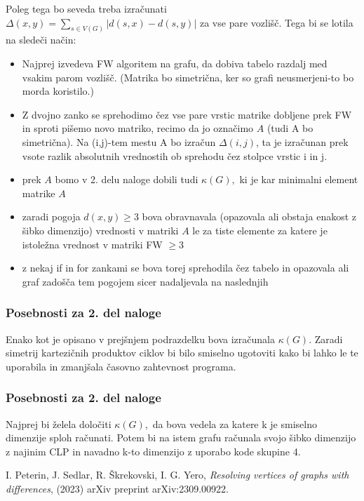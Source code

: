\documentclass[a4paper,12pt]{article}
\begin{document}
Poleg tega bo seveda treba izračunati $\Delta(x,y) = \sum_{s \in V(G) } |d(s,x) - d(s,y)|$ za vse pare vozlišč. Tega bi se lotila na sledeči način:
\begin{itemize}
    \item Najprej izvedeva FW algoritem na grafu, da dobiva tabelo razdalj med vsakim parom vozlišč. (Matrika bo simetrična, ker so grafi neusmerjeni-to bo morda koristilo.)
    \item Z dvojno zanko se sprehodimo čez vse pare vrstic matrike dobljene prek FW in sproti pišemo novo matriko, recimo da jo označimo $A$ (tudi A bo simetrična). Na (i,j)-tem mestu A bo izračun $\Delta(i,j)$, ta je izračunan prek vsote razlik absolutnih vrednostih ob sprehodu čez stolpce vrstic i in j.
    \item prek $A$ bomo v 2. delu naloge dobili tudi $\kappa(G),$ ki je kar minimalni element matrike $A$
    \item zaradi pogoja $d(x,y) \geq 3$ bova obravnavala (opazovala ali obstaja enakost z šibko dimenzijo) vrednosti v matriki $A$ le za tiste elemente za katere je istoležna vrednost v matriki FW  $\geq 3$ 
    \item z nekaj if in for zankami se bova torej sprehodila čez tabelo in opazovala ali graf zadošča tem pogojem sicer nadaljevala na naslednjih 
\end{itemize}

\subsubsection{Posebnosti za 2. del naloge}
Enako kot je opisano v prejšnjem podrazdelku bova izračunala $\kappa(G).$ Zaradi simetrij kartezičnih produktov ciklov bi bilo smiselno ugotoviti kako bi lahko  le te uporabila in zmanjšala časovno zahtevnost programa.

\subsubsection{Posebnosti za 2. del naloge}
Najprej bi želela določiti $\kappa(G),$ da bova vedela za katere k je smiselno dimenzije sploh računati. Potem bi na istem grafu računala svojo šibko dimenzijo z najinim CLP in navadno k-to dimenzijo z uporabo kode skupine 4. 

\begin{thebibliography}{99}
    I. Peterin, J. Sedlar, R. Škrekovski, I. G. Yero,
    \emph{Resolving vertices of graphs with differences},
    (2023) arXiv preprint arXiv:2309.00922.
    \end{thebibliography}
\end{document}
